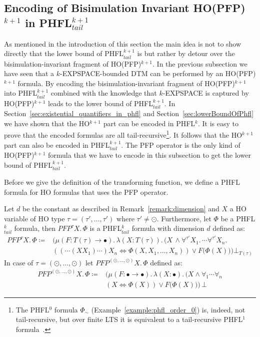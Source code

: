 \subsection{Encoding of Bisimulation Invariant HO(PFP)$^{k+1}$ in PHFL$^{k+1}_{tail}$}\label{subsec:bisimulationInvariantHopfptoPhfl}

As mentioned in the introduction of this section the main idea is not to show directly that the 
lower bound of PHFL$^{k+1}_{tail}$ is  but rather by detour over the 
bisimulation-invariant fragment of HO(PFP)$^{k+1}$. In the previous subsection we have seen 
 that a $k$-EXPSPACE-bounded DTM can be performed by an HO(PFP)$^{k+1}$
formula. By encoding the bisimulation-invariant fragment of HO(PFP)$^{k+1}$ into
PHFL$^{k+1}_{tail}$ combined with the knowledge that $k$-EXPSPACE is captured by 
HO(PFP)$^{k+1}$ leads to the lower bound of PHFL$^{k+1}_{tail}$. In
Section~\ref{sec:existential_quantifiers_in_phfl} and Section~\ref{sec:lowerBoundOfPhfl} we 
have shown that the HO$^{k+1}$ part can be encoded in PHFL$^k$. It is easy to prove that the 
encoded formulas are all tail-recursive\footnote{The PHFL$^0$ formula $\Phi_\sim$ (Example~\ref{example:phfl_order_0}) is, indeed, not tail-recursive, but over finite LTS it is equivalent to a tail-recursive PHFL$^1$ formula~\cite{lange2014capturing_long}.}. It follows that the HO$^{k+1}$ part can also be 
encoded in  PHFL$^{k+1}_{tail}$. The PFP operator is the only kind of HO(PFP)$^{k+1}$ formula 
that we have to encode in this subsection to get the lower bound of PHFL$^{k+1}_{tail}$.

Before we give the definition of the transforming function, we define a PHFL formula for HO formulas that uses the PFP operator.

\begin{definition}
Let $d$ be the constant as described in Remark~\ref{remark:dimension} and $X$ a HO variable of HO type $\tau = (\tau', \dots, \tau')$ where $\tau' \neq \odot$. Furthermore, let
    $\Phi$ be a PHFL$^k_{tail}$
    formula, then $PFP^\tau X.\,\Phi$
    is a PHFL$^k_{tail}$ formula with dimension $d$ defined as:
    \begin{align*}
     PFP^\tau X. \, \Phi \coloneqq &\Big(\mu (F \colon T(\tau) \rightarrow \bullet).\,\lambda (X \colon T(\tau)).\, \big(X\,\wedge \forall^{\tau'}X_1.\, \dotsb \forall^{\tau'}X_n.\, \\&( (\dotsb (X X_1) \dotsb) X_n \Leftrightarrow \Phi(X, X_1, \dots, X_n) ) \vee F(\Phi(X)\big)\Big)\bot_{T(\tau)}
\end{align*}    
    In case of $\tau = (\odot, \dots, \odot)$ let $PFP^{(\odot, \dots, \odot)} X.\,\Phi$ defined as:
    \begin{align*}
    PFP^{(\odot, \dots, \odot)} X.\,\Phi \coloneqq & \Big(\mu (F \colon \bullet \rightarrow \bullet).\,\lambda (X \colon \bullet).\, \big(X \wedge \forall_1 \dotsb \forall_n \\&(X \Leftrightarrow \Phi(X)) \vee F(\Phi(X)\big)\Big)\,\bot 
    \end{align*}
\end{definition}

